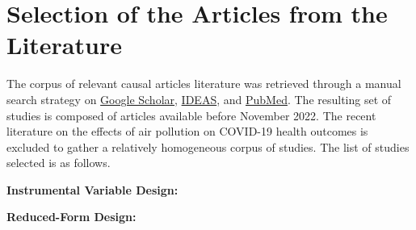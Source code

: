 \documentclass[12pt]{article}
\begin{document}



\pagebreak

\singlespacing
\setlength\bibsep{0pt}


\onehalfspacing

\pagebreak




\appendix

\section{Selection of the Articles from the Literature} \label{selection_lit}
	\setcounter{figure}{0}
	\renewcommand\thefigure{\thesection.\arabic{figure}}   
	
	The corpus of relevant causal articles literature was retrieved through a manual search strategy on \href{https://scholar.google.com/}{Google Scholar}, \href{https://ideas.repec.org/}{IDEAS}, and \href{https://pubmed.ncbi.nlm.nih.gov/}{PubMed}. The resulting set of studies is composed of articles available before November 2022. The recent literature on the effects of air pollution on COVID-19 health outcomes is excluded to gather a relatively homogeneous corpus of studies. The list of studies selected is as follows.

	\singlespacing
	\noindent\textbf{Instrumental Variable Design:} \cite{moretti_pollution_2011, ebenstein_particulate_2015, schwartz_estimating_2015, arceo_does_2016, he_effect_2016,
	knittel_caution_2016, schlenker_airports_2016, sheldon_impact_2017, schwartz_estimating_2017, zhong_traffic_2017, barwick_morbidity_2018, hanlon_london_2018,
	schwartz_national_2018, halliday_vog_2019, deryugina_mortality_2019, aguilar2020adaptation, cheung_mitigating_2020, fan_impact_2020, he_straw_2020, giaccherini_when_2021,
	godzinski_disentangling_2021, guidetti_placebo_2021, kim_air_2021, liu_effect_2021, xia_short-term_2022}
	
	\noindent\textbf{Reduced-Form Design:} \cite{bauernschuster_when_2017, jans_economic_2018, jia_is_2019, godzinski2019short}
	
\end{document}
